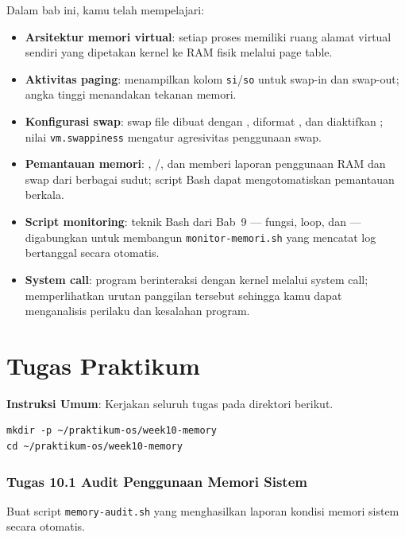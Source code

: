 Dalam bab ini, kamu telah mempelajari:

\begin{itemize}
    \item \textbf{Arsitektur memori virtual}: setiap proses memiliki ruang alamat virtual
          sendiri yang dipetakan kernel ke RAM fisik melalui page table.
    \item \textbf{Aktivitas paging}:  menampilkan kolom \texttt{si}/\texttt{so}
          untuk swap-in dan swap-out; angka tinggi menandakan tekanan memori.
    \item \textbf{Konfigurasi swap}: swap file dibuat dengan , diformat
          , dan diaktifkan ; nilai \texttt{vm.swappiness} mengatur
          agresivitas penggunaan swap.
    \item \textbf{Pemantauan memori}: , /, dan
           memberi laporan penggunaan RAM dan swap dari berbagai sudut;
          script Bash dapat mengotomatiskan pemantauan berkala.
    \item \textbf{Script monitoring}: teknik Bash dari Bab~9 --- fungsi, loop, dan
           --- digabungkan untuk membangun \texttt{monitor-memori.sh} yang
          mencatat log bertanggal secara otomatis.
    \item \textbf{System call}: program berinteraksi dengan kernel melalui system call;
           memperlihatkan urutan panggilan tersebut sehingga kamu dapat
          menganalisis perilaku dan kesalahan program.
\end{itemize}

\section{Tugas Praktikum}

\textbf{Instruksi Umum}: Kerjakan seluruh tugas pada direktori berikut.

\begin{lstlisting}[caption={Persiapan direktori tugas}]
mkdir -p ~/praktikum-os/week10-memory
cd ~/praktikum-os/week10-memory
\end{lstlisting}

\subsubsection{Tugas 10.1 Audit Penggunaan Memori Sistem}

Buat script \texttt{memory-audit.sh} yang menghasilkan laporan kondisi memori
sistem secara otomatis.


